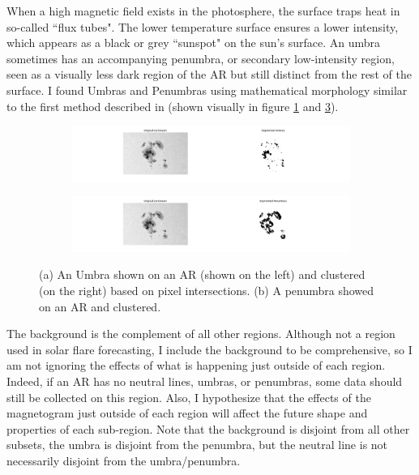 \documentclass[defaultstyle,11pt]{thesis}
\begin{document}
When a high magnetic field exists in the photosphere, the surface traps heat in so-called ``flux tubes". The lower temperature surface ensures a lower intensity, which appears as a black or grey ``sunspot" on the sun's surface. An umbra sometimes has an accompanying penumbra, or secondary low-intensity region, seen as a visually less dark region of the AR but still distinct from the rest of the surface. I found Umbras and Penumbras using mathematical morphology similar to the first method described in \cite{comparisonofumpenmethod} (shown visually in figure \ref{fig:umbra} and \ref{fig:penumbra}).
\begin{figure}[h]
\centering
\begin{subfigure}[b]{0.8\textwidth}
   \includegraphics[width=\linewidth]{ThesisFilePkg/figures/data/umbras.png}
   \caption{}
   \label{fig:umbra} 
\end{subfigure}
\begin{subfigure}[b]{0.8\textwidth}
   \includegraphics[width=\linewidth]{ThesisFilePkg/figures/data/penumbras.png}
   \caption{}
   \label{fig:penumbra}
\end{subfigure}
\caption[Umbra and Penumbra]{(a) An Umbra shown on an AR (shown on the left) and clustered (on the right) based on pixel intersections. (b) A penumbra showed on an AR and clustered.}
\end{figure}

The background is the complement of all other regions. Although not a region used in solar flare forecasting, I include the background to be comprehensive, so I am not ignoring the effects of what is happening just outside of each region. Indeed, if an AR has no neutral lines, umbras, or penumbras, some data should still be collected on this region. Also, I hypothesize that the effects of the magnetogram just outside of each region will affect the future shape and properties of each sub-region. Note that the background is disjoint from all other subsets, the umbra is disjoint from the penumbra, but the neutral line is not necessarily disjoint from the umbra/penumbra.
\end{document}
